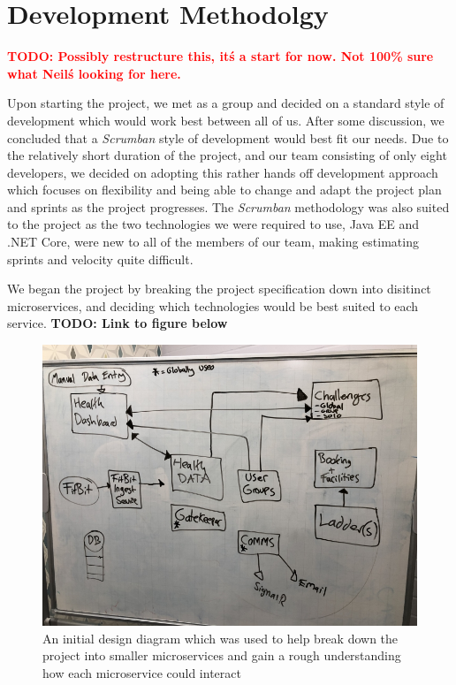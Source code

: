 \chapter{Development Methodolgy}

\textcolor{red}{\textbf{TODO: Possibly restructure this, it\'s a start for now. Not 100\% sure what Neil\'s looking for here.}}

Upon starting the project, we met as a group and decided on a standard style of development which would work best between all of us. After some discussion, we concluded that a \textit{Scrumban}\cite{scrumban} style of development would best fit our needs. Due to the relatively short duration of the project, and our team consisting of only eight developers, we decided on adopting this rather hands off development approach which focuses on flexibility and being able to change and adapt the project plan and sprints as the project progresses. The \textit{Scrumban} methodology was also suited to the project as the two technologies we were required to use, Java EE and .NET Core, were new to all of the members of our team, making estimating sprints and velocity quite difficult. 

We began the project by breaking the project specification down into disitinct microservices, and deciding which technologies would be best suited to each service. \textbf{TODO: Link to figure below}

\begin{figure}[H]
    \centering
    \includegraphics[width=\textwidth]{Images/Initial_Spec_Chart.jpg}
    \caption{An initial design diagram which was used to help break down the project into smaller microservices and gain a rough understanding how each microservice could interact}
\end{figure}

